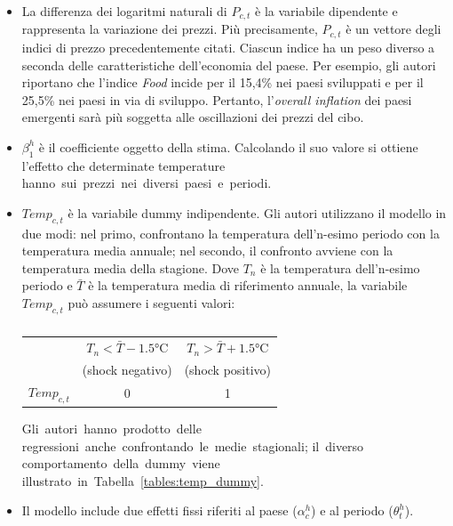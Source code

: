 \begin{itemize}
	\item La differenza dei logaritmi naturali di $P_{c,t}$ è la variabile dipendente e rappresenta la variazione dei prezzi. Più precisamente, $P_{c,t}$ è un vettore degli indici di prezzo precedentemente citati. Ciascun indice ha un peso diverso a seconda delle caratteristiche dell'economia del paese. Per esempio, gli autori riportano che l'indice \textit{Food} incide per il 15,4\% nei paesi sviluppati e per il 25,5\% nei paesi in via di sviluppo. Pertanto, l'\textit{overall inflation} dei paesi emergenti sarà più soggetta alle oscillazioni dei prezzi del cibo.
	
	\item $\beta_{1}^{h}$ è il coefficiente oggetto della stima. Calcolando il suo valore si ottiene l'effetto che determinate temperature hanno~sui~prezzi~nei~diversi~paesi~e~periodi.

	\item $Temp_{c,t}$ è la variabile dummy indipendente. Gli autori utilizzano il modello in due modi: nel primo, confrontano la temperatura dell'n-esimo periodo con la temperatura media annuale; nel secondo, il confronto avviene con la temperatura media della stagione. Dove $T_n$ è la temperatura dell'n-esimo periodo e $\bar{T}$ è la temperatura media di riferimento annuale, la variabile $Temp_{c,t}$ può assumere i seguenti valori:
	
	\begin{table}[h]
		\centering
		\begin{tabular}{l|c|c}
			\toprule
			& $T_n < \bar{T} -1.5$°C & $T_n > \bar{T}+1.5$°C \\
			& (shock negativo) & (shock positivo) \\
			\midrule
			$Temp_{c,t}$ & 0 & 1 \\
			\bottomrule
		\end{tabular}
		\caption{}
	\end{table}

	Gli~autori~hanno~prodotto~delle regressioni~anche~confrontando~le~medie~stagionali; il~diverso comportamento~della~dummy~viene illustrato~in~Tabella~\ref{tables:temp_dummy}.

	\item Il modello include due effetti fissi riferiti al paese ($\alpha_{c}^{h}$)  e al periodo ($\theta_{t}^{h}$).

\end{itemize}

